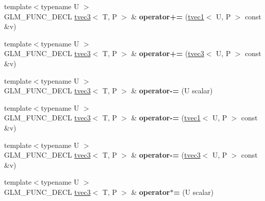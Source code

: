\begin{DoxyCompactItemize}
\item 
\mbox{\label{structglm_1_1tvec3_acfd1571d1fab5431b44fdad4d63f3134}} 
{\footnotesize template$<$typename U $>$ }\\G\+L\+M\+\_\+\+F\+U\+N\+C\+\_\+\+D\+E\+CL \hyperlink{structglm_1_1tvec3}{tvec3}$<$ T, P $>$ \& {\bfseries operator+=} (\hyperlink{structglm_1_1tvec1}{tvec1}$<$ U, P $>$ const \&v)
\item 
\mbox{\label{structglm_1_1tvec3_aca33e625fbb5231fe04a31a3f6ac7d9c}} 
{\footnotesize template$<$typename U $>$ }\\G\+L\+M\+\_\+\+F\+U\+N\+C\+\_\+\+D\+E\+CL \hyperlink{structglm_1_1tvec3}{tvec3}$<$ T, P $>$ \& {\bfseries operator+=} (\hyperlink{structglm_1_1tvec3}{tvec3}$<$ U, P $>$ const \&v)
\item 
\mbox{\label{structglm_1_1tvec3_adfb7d908bd3a5fe2e176a7e806008de6}} 
{\footnotesize template$<$typename U $>$ }\\G\+L\+M\+\_\+\+F\+U\+N\+C\+\_\+\+D\+E\+CL \hyperlink{structglm_1_1tvec3}{tvec3}$<$ T, P $>$ \& {\bfseries operator-\/=} (U scalar)
\item 
\mbox{\label{structglm_1_1tvec3_a8ebee86f6ea622e744ecedaf7e7db9ff}} 
{\footnotesize template$<$typename U $>$ }\\G\+L\+M\+\_\+\+F\+U\+N\+C\+\_\+\+D\+E\+CL \hyperlink{structglm_1_1tvec3}{tvec3}$<$ T, P $>$ \& {\bfseries operator-\/=} (\hyperlink{structglm_1_1tvec1}{tvec1}$<$ U, P $>$ const \&v)
\item 
\mbox{\label{structglm_1_1tvec3_a356d8232f5a66a5e971ab1cb46593722}} 
{\footnotesize template$<$typename U $>$ }\\G\+L\+M\+\_\+\+F\+U\+N\+C\+\_\+\+D\+E\+CL \hyperlink{structglm_1_1tvec3}{tvec3}$<$ T, P $>$ \& {\bfseries operator-\/=} (\hyperlink{structglm_1_1tvec3}{tvec3}$<$ U, P $>$ const \&v)
\item 
\mbox{\label{structglm_1_1tvec3_ad3afa22d5db30fd87b72f0d1daec6e3a}} 
{\footnotesize template$<$typename U $>$ }\\G\+L\+M\+\_\+\+F\+U\+N\+C\+\_\+\+D\+E\+CL \hyperlink{structglm_1_1tvec3}{tvec3}$<$ T, P $>$ \& {\bfseries operator$\ast$=} (U scalar)
\item 

\end{DoxyCompactItemize}
